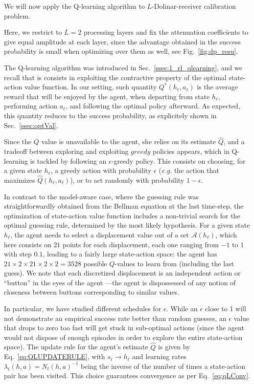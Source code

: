 We will now apply the Q-learning algorithm to $L$-Dolinar-receiver calibration problem.

Here, we restrict to $L=2$ processing layers and fix the attenuation coefficients to give equal amplitude at each layer, since the advantage obtained in the success probability is small when optimizing over them as well, see Fig.~\ref{fig:dp_resu}.

The Q-learning algorithm was introduced in Sec.~\ref{ssec:1_rl_qlearning}, and we recall that is consists in exploiting the contractive property of the optimal state-action value function. In our setting, such quantity $Q^*(h_\ell, a_\ell)$ is the average reward that will be enjoyed by the agent, when departing from state $h_\ell$, performing action $a_\ell$, and following the optimal policy afterward. As expected, this quantity reduces to the success probability, as explicitely shown in Sec.~\ref{ssec:optVal}.

Since the $Q$ value is unavailable to the agent, she relies on its estimate $\hat{Q}$, and a tradeoff between exploring and exploiting $greedy$ policies appears, which in Q-learning is tackled by following an $\epsilon$-greedy policy. This consists on choosing, for a given state $h_\ell$, a greedy action with probability $\epsilon$ (\textit{e.g.} the action that maximizes $\hat{Q}(h_\ell, a_\ell)$), or to act randomly with probability $1-\epsilon$.

In contrast to the model-aware case, where the guessing rule was straightforwardly obtained from the Bellman equation at the last time-step, the optimization of state-action value function includes a non-trivial search for the optimal guessing rule, determined by the most likely hypothesis. For a given state $h_\ell$, the agent needs to select a displacement value out of a set $\mathcal{A}(h_\ell)$, which here consists on $21$ points for each displacement, each one ranging from $-1$ to $1$ with step $0.1$, leading to a fairly large state-action space: the agent has $21\times 2 \times 21 \times 2 \times 2=3528$ possible $Q$-values to learn from (including the last guess). We note that each discretized displacement is an independent action or ``button'' in the eyes of the agent ---the agent is dispossessed of any notion of closeness between buttons corresponding to similar values.

In particular, we have studied different schedules for $\epsilon$. While an $\epsilon$ close to 1 will not demonstrate an empirical success rate better than random guesses, an $\epsilon$ value that drops to zero too fast will get stuck in sub-optimal actions (since the agent would not dispose of enough episodes in order to explore the entire state-action space). The update rule for the agent's estimate $\hat{Q}$ is given by Eq.~\eqref{eq:QLUPDATERULE}, with $s_\ell\rightarrow h_\ell$ and learning rates $\lambda_t(h,a)=N_{t}(h,a)^{-1}$ being the inverse of the number of times a state-action pair has been visited. This choice guarantees convergence as per Eq.~\eqref{eq:qLConv}.

